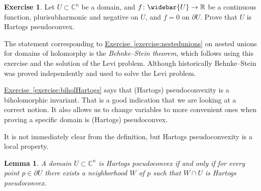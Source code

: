 \documentclass[12pt,openany]{book}
\newcommand{\C}{{\mathbb{C}}}
\newcommand{\R}{{\mathbb{R}}}
\newcommand{\myindex}[1]{#1\index{#1}}
\theoremstyle{plain}
\newtheorem{lemma}[thm]{Lemma}
\theoremstyle{remark}
\theoremstyle{definition}
\newenvironment{exbox}{%
    \def\FrameCommand{\vrule width 1pt \relax\hspace{10pt}}%
    \MakeFramed{\advance\hsize-\width\FrameRestore}%
}{%
    \endMakeFramed
}
\theoremstyle{exercise}
\newtheorem{exercise}{Exercise}[section]
\theoremstyle{example}
\newcommand{\exerciseref}[1]{\hyperref[#1]{Exercise~\ref*{#1}}}
\begin{document}
\begin{exbox}
\begin{exercise}
Let $U \subset \C^n$ be a domain, and $f \colon \widebar{U} \to \R$ be a
continuous function, plurisubharmonic and negative on $U$, and $f=0$ on $\partial
U$.  Prove that $U$ is Hartogs pseudoconvex.
\end{exercise}
\end{exbox}

The statement corresponding to \exerciseref{exercise:nestedunions} on nested unions
for domains of holomorphy is
the \emph{\myindex{Behnke--Stein theorem}}, which follows using this exercise and the solution
of the Levi problem.  Although historically Behnke--Stein was proved
independently and used to solve the Levi problem.

\exerciseref{exercise:biholHartogs} says that (Hartogs) pseudoconvexity is a
biholomorphic invariant.  That is a good indication that we are looking at a
correct notion.  It also allows us to change variables to more convenient
ones when proving a specific domain is (Hartogs) pseudoconvex.

It is not immediately clear from the definition, but Hartogs pseudoconvexity
is a local property.

\begin{lemma}
A domain $U \subset \C^n$ is Hartogs pseudoconvex if and only if
for every point $p \in \partial U$ there exists a neighborhood $W$ of $p$
such that $W \cap U$ is Hartogs pseudoconvex.
\end{lemma}
\end{document}
